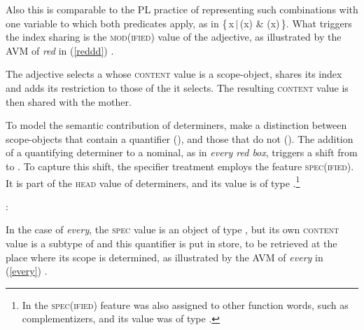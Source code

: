 \documentclass[output=paper,biblatex,babelshorthands,newtxmath,draftmode,colorlinks,citecolor=brown]{langscibook}
\begin{document}
\noindent
Also this is comparable to the PL practice of representing such 
combinations with one variable to which both predicates apply, as in 
\{\,x\,$|$\,(x) \& (x)\,\}. What triggers the index sharing is 
the \textsc{mod(ified)} value of the adjective, as illustrated by the AVM of 
\emph{red} in (\ref{reddd}) \citep[55]{ps2}.

\begin{exe} 
\ex\label{reddd}
\end{exe}

\noindent
The adjective selects a  whose \textsc{content} value is a scope-object, 
shares its index and adds its restriction to those of the  it selects. 
The resulting \textsc{content} value is then shared with the mother.

\begin{sloppypar}
To model the semantic contribution of determiners, \citet[135--136]{GS00} 
make a distinction between scope-objects that contain a quantifier 
(), and those that do not (). 
The addition of a quantifying determiner to a nominal, 
as in \emph{every red box}, triggers a shift from  to . 
To capture this shift, the specifier treatment employs the feature \textsc{spec(ified)}. 
It is part of the \textsc{head} value of determiners, and its value is of type 
 \citep[362]{GS00}.\footnote{In \citet[45]{ps2} the \textsc{spec(ified)}
feature was also assigned to other function words, such as complementizers, 
and its value was of type .}   
\end{sloppypar}

\begin{exe} 
\ex   {}: 
\end{exe} 

\noindent
In the case of \emph{every}, the \textsc{spec} value is an object of 
type , but its own \textsc{content} value is a subtype of 
 and this quantifier is put in store, to be retrieved 
at the place where its scope is determined, as illustrated by the AVM
of \emph{every} in (\ref{every}) \citep[204]{GS00}.  
\end{document}
